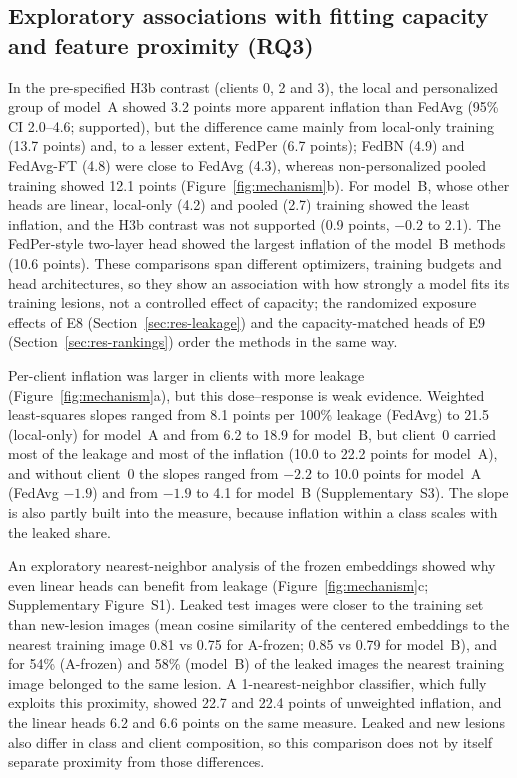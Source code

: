 \documentclass[VANCOUVER,Times1COL]{WileyNJDv5}
\begin{document}
\subsection{Exploratory associations with fitting capacity and feature proximity (RQ3)}
\label{sec:res-mechanism}

In the pre-specified H3b contrast (clients 0, 2 and 3), the local and personalized group of model~A showed
3.2 points more apparent inflation than FedAvg (95\% CI 2.0--4.6; supported), but the difference came
mainly from local-only training (13.7 points) and, to a lesser extent, FedPer (6.7 points); FedBN (4.9) and
FedAvg-FT (4.8) were close to FedAvg (4.3), whereas non-personalized pooled training showed 12.1 points
(Figure~\ref{fig:mechanism}b). For model~B, whose other heads are linear, local-only (4.2) and pooled (2.7)
training showed the least inflation, and the H3b contrast was not supported (0.9 points, $-0.2$ to 2.1).
The FedPer-style two-layer head showed the largest inflation of the model~B methods (10.6 points). These
comparisons span different optimizers, training budgets and head architectures, so they show an
association with how strongly a model fits its training lesions, not a controlled effect of capacity; the
randomized exposure effects of E8 (Section~\ref{sec:res-leakage}) and the capacity-matched heads of E9
(Section~\ref{sec:res-rankings}) order the methods in the same way.

Per-client inflation was larger in clients with more leakage (Figure~\ref{fig:mechanism}a), but this
dose--response is weak evidence. Weighted least-squares slopes ranged from 8.1 points per 100\% leakage
(FedAvg) to 21.5 (local-only) for model~A and from 6.2 to 18.9 for model~B, but client~0 carried most of
the leakage and most of the inflation (10.0 to 22.2 points for model~A), and without client~0 the slopes
ranged from $-2.2$ to 10.0 points for model~A (FedAvg $-1.9$) and from $-1.9$ to 4.1 for model~B
(Supplementary~S3). The slope is also partly built into the measure, because inflation within a class
scales with the leaked share.

An exploratory nearest-neighbor analysis of the frozen embeddings showed why even linear heads can benefit
from leakage (Figure~\ref{fig:mechanism}c; Supplementary Figure~S1). Leaked test images were closer to the
training set than new-lesion images (mean cosine similarity of the centered embeddings to the nearest
training image 0.81 vs 0.75 for A-frozen; 0.85 vs 0.79 for model~B), and for 54\% (A-frozen) and 58\%
(model~B) of the leaked images the nearest training image belonged to the same lesion. A 1-nearest-neighbor
classifier, which fully exploits this proximity, showed 22.7 and 22.4 points of unweighted inflation, and
the linear heads 6.2 and 6.6 points on the same measure. Leaked and new lesions also differ in class and
client composition, so this comparison does not by itself separate proximity from those differences.
\end{document}
